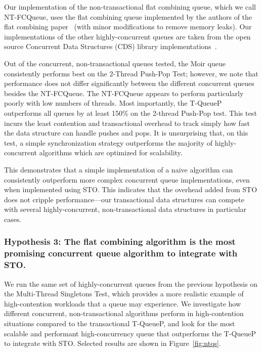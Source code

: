Our implementation of the non-transactional flat combining queue, which we call NT-FCQueue, uses the flat combining queue implemented by the authors of the flat combining paper~\cite{flatcombining} (with minor modifications to remove memory leaks). Our implementations of the other highly-concurrent queues are taken from the open source Concurrent Data Structures (CDS) library implementations~\cite{libcds}. 

Out of the concurrent, non-transactional queues tested, the Moir queue~\cite{queue2} consistently performs best on the 2-Thread Push-Pop Test; however, we note that performance does not differ significantly between the different concurrent queues besides the NT-FCQueue. The NT-FCQueue appears to perform particularly poorly with low numbers of threads. Most importantly, the T-QueueP outperforms all queues by at least 150\% on the 2-thread Push-Pop test. This test incurs the least contention and transactional overhead to track simply how fast the data structure can handle pushes and pops. It is unsurprising that, on this test, a simple synchronization strategy outperforms the majority of highly-concurrent algorithms which are optimized for scalability. 

This demonstrates that a simple implementation of a naive algorithm can consistently outperform more complex concurrent queue implementations, even when implemented using STO. This indicates that the overhead added from STO does not cripple performance---our transactional data structures can compete with several highly-concurrent, non-transactional data structures in particular cases. 

\vspace{12pt}
\noindent{}

\subsubsection{Hypothesis 3: The flat combining algorithm is the most promising concurrent queue algorithm to integrate with STO.}
\label{eval:hypo3}

We run the same set of highly-concurrent queues from the previous hypothesis on the Multi-Thread Singletons Test, which provides a more realistic example of high-contention workloads that a queue may experience. We investigate how different concurrent, non-transactional algorithms perform in high-contention situations compared to the transactional T-QueueP, and look for the most scalable and performant high-concurrency queue that outperforms the T-QueueP to integrate with STO. Selected results are shown in Figure~\ref{fig:ntqs}.

